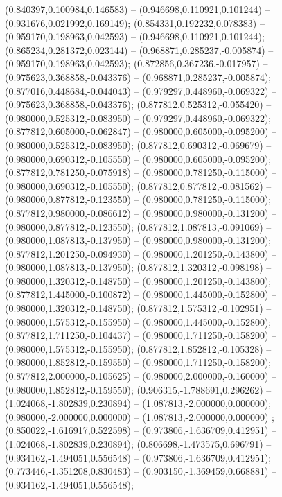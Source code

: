  (0.840397,0.100984,0.146583) -- (0.946698,0.110921,0.101244) -- (0.931676,0.021992,0.169149);
 (0.854331,0.192232,0.078383) -- (0.959170,0.198963,0.042593) -- (0.946698,0.110921,0.101244);
 (0.865234,0.281372,0.023144) -- (0.968871,0.285237,-0.005874) -- (0.959170,0.198963,0.042593);
 (0.872856,0.367236,-0.017957) -- (0.975623,0.368858,-0.043376) -- (0.968871,0.285237,-0.005874);
 (0.877016,0.448684,-0.044043) -- (0.979297,0.448960,-0.069322) -- (0.975623,0.368858,-0.043376);
 (0.877812,0.525312,-0.055420) -- (0.980000,0.525312,-0.083950) -- (0.979297,0.448960,-0.069322);
 (0.877812,0.605000,-0.062847) -- (0.980000,0.605000,-0.095200) -- (0.980000,0.525312,-0.083950);
 (0.877812,0.690312,-0.069679) -- (0.980000,0.690312,-0.105550) -- (0.980000,0.605000,-0.095200);
 (0.877812,0.781250,-0.075918) -- (0.980000,0.781250,-0.115000) -- (0.980000,0.690312,-0.105550);
 (0.877812,0.877812,-0.081562) -- (0.980000,0.877812,-0.123550) -- (0.980000,0.781250,-0.115000);
 (0.877812,0.980000,-0.086612) -- (0.980000,0.980000,-0.131200) -- (0.980000,0.877812,-0.123550);
 (0.877812,1.087813,-0.091069) -- (0.980000,1.087813,-0.137950) -- (0.980000,0.980000,-0.131200);
 (0.877812,1.201250,-0.094930) -- (0.980000,1.201250,-0.143800) -- (0.980000,1.087813,-0.137950);
 (0.877812,1.320312,-0.098198) -- (0.980000,1.320312,-0.148750) -- (0.980000,1.201250,-0.143800);
 (0.877812,1.445000,-0.100872) -- (0.980000,1.445000,-0.152800) -- (0.980000,1.320312,-0.148750);
 (0.877812,1.575312,-0.102951) -- (0.980000,1.575312,-0.155950) -- (0.980000,1.445000,-0.152800);
 (0.877812,1.711250,-0.104437) -- (0.980000,1.711250,-0.158200) -- (0.980000,1.575312,-0.155950);
 (0.877812,1.852812,-0.105328) -- (0.980000,1.852812,-0.159550) -- (0.980000,1.711250,-0.158200);
 (0.877812,2.000000,-0.105625) -- (0.980000,2.000000,-0.160000) -- (0.980000,1.852812,-0.159550);
 (0.906315,-1.788691,0.296262) -- (1.024068,-1.802839,0.230894) -- (1.087813,-2.000000,0.000000);
 (0.980000,-2.000000,0.000000) -- (1.087813,-2.000000,0.000000) ;
 (0.850022,-1.616917,0.522598) -- (0.973806,-1.636709,0.412951) -- (1.024068,-1.802839,0.230894);
 (0.806698,-1.473575,0.696791) -- (0.934162,-1.494051,0.556548) -- (0.973806,-1.636709,0.412951);
 (0.773446,-1.351208,0.830483) -- (0.903150,-1.369459,0.668881) -- (0.934162,-1.494051,0.556548);
